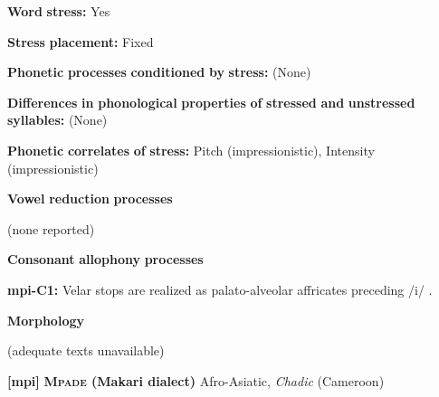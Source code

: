 \begin{styleBody}
\textbf{Word} \textbf{stress:} Yes
\end{styleBody}

\begin{styleBody}
\textbf{Stress} \textbf{placement:} Fixed
\end{styleBody}

\begin{styleBody}
\textbf{Phonetic} \textbf{processes} \textbf{conditioned} \textbf{by} \textbf{stress:} (None)
\end{styleBody}

\begin{styleBody}
\textbf{Differences} \textbf{in} \textbf{phonological} \textbf{properties} \textbf{of} \textbf{stressed} \textbf{and} \textbf{unstressed} \textbf{syllables:} (None)
\end{styleBody}

\begin{styleBody}
\textbf{Phonetic} \textbf{correlates} \textbf{of} \textbf{stress:} Pitch (impressionistic), Intensity (impressionistic)
\end{styleBody}

\begin{styleBody}
\textbf{Vowel} \textbf{reduction} \textbf{processes}
\end{styleBody}

\begin{styleBody}
(none reported)
\end{styleBody}

\begin{styleBody}
\textbf{Consonant} \textbf{allophony} \textbf{processes}
\end{styleBody}

\begin{styleBody}
\textbf{mpi-C1:} Velar stops are realized as palato-alveolar affricates preceding /i/ \citep{Allison2012}.
\end{styleBody}

\begin{styleBody}
\textbf{Morphology}
\end{styleBody}

\begin{styleBody}
(adequate texts unavailable)
\end{styleBody}

\begin{styleBody}
\textbf{[mpi]}   \textbf{\textsc{Mpade} \textbf{(Makari} \textbf{dialect)}}  Afro-Asiatic, \textit{Chadic} (Cameroon)
\end{styleBody}

